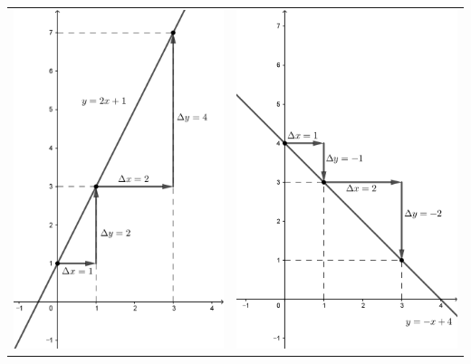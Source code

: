 \documentclass{oblivoir}
\begin{document}
\begin{center}
\begin{tabular}{cc}
\includegraphics[width=.48\textwidth]{slope1}
&\includegraphics[width=.48\textwidth]{slope2}
\end{tabular}
\end{center}
\end{document}
